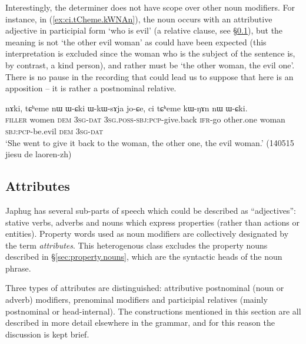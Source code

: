 Interestingly, the determiner  does not have scope over other noun modifiers. For instance, in (\ref{ex:ci.tCheme.kWNAn}), the noun  occurs with an attributive adjective in participial form  `who is evil' (a relative clause, see §\ref{sec:attributes}), but the meaning is not `the other evil woman' as could have been expected (this interpretation is excluded since the woman who is the subject of the sentence is, by contrast, a kind person), and rather must be `the other woman, the evil one'. There is no pause in the recording that could lead us to suppose that  here is an apposition -- it is rather a postnominal relative.

\begin{exe}
\ex \label{ex:ci.tCheme.kWNAn}
\gll nɤki, tɕʰeme nɯ ɯ-ɕki ɯ-kɯ-sɤja jo-ɕe, ci tɕʰeme kɯ-ŋɤn nɯ ɯ-ɕki. \\
\textsc{filler} women \textsc{dem} \textsc{3sg}-\textsc{dat} \textsc{3sg}.\textsc{poss}-\textsc{sbj}:\textsc{pcp}-give.back \textsc{ifr}-go other.one woman \textsc{sbj}:\textsc{pcp}-be.evil \textsc{dem} \textsc{3sg}-\textsc{dat} \\
\glt `She went to give it back to the woman, the other one, the evil woman.' (140515 jiesu de laoren-zh)
\end{exe}


\subsection{Attributes} \label{sec:attributes}
Japhug has several sub-parts of speech which could be described as ``adjectives'': stative verbs, adverbs and nouns which express properties (rather than actions or entities). Property words used as noun modifiers are collectively designated by the term \textit{attributes}. This heterogenous class excludes the property nouns described in §\ref{sec:property.nouns}, which are the syntactic heads of the noun phrase.

Three types of attributes are distinguished: attributive postnominal (noun or adverb) modifiers, prenominal modifiers and participial  relatives (mainly postnominal or head-internal). The constructions mentioned in this section are all described in more detail elsewhere in the grammar, and for this reason the discussion is kept brief.

